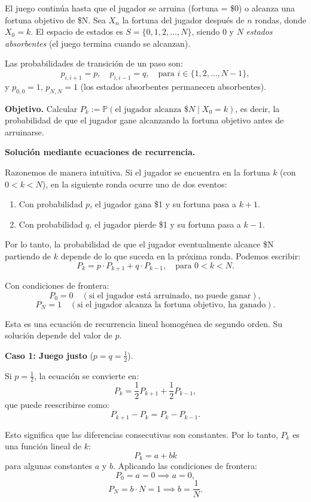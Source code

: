 \documentclass[12pt]{book}
\begin{document}
El juego continúa hasta que el jugador se arruina (fortuna = \$0) o alcanza una fortuna objetivo de \$N. Sea $X_n$ la fortuna del jugador después de $n$ rondas, donde $X_0 = k$. El espacio de estados es $S = \{0, 1, 2, \ldots, N\}$, siendo 0 y $N$ \textit{estados absorbentes} (el juego termina cuando se alcanzan).

Las probabilidades de transición de un paso son:
\[
p_{i,i+1} = p, \quad p_{i,i-1} = q, \quad \text{para } i \in \{1, 2, \ldots, N-1\},
\]
y $p_{0,0} = 1$, $p_{N,N} = 1$ (los estados absorbentes permanecen absorbentes).

\textbf{Objetivo.} Calcular $P_k := \mathbb{P}(\text{el jugador alcanza } \$N \mid X_0 = k)$, es decir, la probabilidad de que el jugador gane alcanzando la fortuna objetivo antes de arruinarse.

\textbf{Solución mediante ecuaciones de recurrencia.} 

Razonemos de manera intuitiva. Si el jugador se encuentra en la fortuna $k$ (con $0 < k < N$), en la siguiente ronda ocurre uno de dos eventos:
\begin{enumerate}
    \item Con probabilidad $p$, el jugador gana \$1 y su fortuna pasa a $k+1$.
    \item Con probabilidad $q$, el jugador pierde \$1 y su fortuna pasa a $k-1$.
\end{enumerate}

Por lo tanto, la probabilidad de que el jugador eventualmente alcance \$N partiendo de $k$ depende de lo que suceda en la próxima ronda. Podemos escribir:
\[
P_k = p \cdot P_{k+1} + q \cdot P_{k-1}, \quad \text{para } 0 < k < N.
\]

Con condiciones de frontera:
\[
P_0 = 0 \quad (\text{si el jugador está arruinado, no puede ganar}),
\]
\[
P_N = 1 \quad (\text{si el jugador alcanza la fortuna objetivo, ha ganado}).
\]

Esta es una ecuación de recurrencia lineal homogénea de segundo orden. Su solución depende del valor de $p$.

\textbf{Caso 1: Juego justo} ($p = q = \frac{1}{2}$).

Si $p = \frac{1}{2}$, la ecuación se convierte en:
\[
P_k = \frac{1}{2} P_{k+1} + \frac{1}{2} P_{k-1},
\]
que puede reescribirse como:
\[
P_{k+1} - P_k = P_k - P_{k-1}.
\]

Esto significa que las diferencias consecutivas son constantes. Por lo tanto, $P_k$ es una función lineal de $k$:
\[
P_k = a + bk
\]
para algunas constantes $a$ y $b$. Aplicando las condiciones de frontera:
\[
P_0 = a = 0 \implies a = 0,
\]
\[
P_N = b \cdot N = 1 \implies b = \frac{1}{N}.
\]
\end{document}
